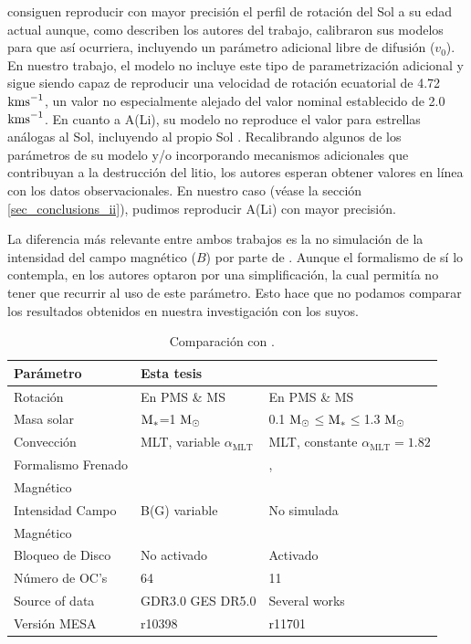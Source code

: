 \cite{Gossage2021} consiguen reproducir con mayor precisión el perfil de rotación del Sol a su edad actual \cite[ver][panel (a) de las figuras 2, 4 \& 6]{Gossage2021} aunque, como describen los autores del trabajo, calibraron sus modelos para que así ocurriera, incluyendo un parámetro adicional libre de difusión ($v_0$). En nuestro trabajo, el modelo no incluye este tipo de parametrización adicional y sigue siendo capaz de reproducir una velocidad de rotación ecuatorial de 4.72 $\mathrm{kms}^{-1}$, un valor no especialmente alejado del valor nominal establecido de 2.0 $\mathrm{kms}^{-1}$. En cuanto a A(Li), su modelo no reproduce el valor para estrellas análogas al Sol, incluyendo al propio Sol \cite[ver][panel (d) de las figuras 2 \& 4, y (b) de la figura 6]{Gossage2021}. Recalibrando algunos de los parámetros de su modelo y/o incorporando mecanismos adicionales que contribuyan a la destrucción del litio, los autores esperan obtener valores en línea con los datos observacionales. En nuestro caso (véase la sección \ref{sec_conclusions_ii}), pudimos reproducir A(Li) con mayor precisión.

La diferencia más relevante entre ambos trabajos es la no simulación de la intensidad del campo magnético ($B$) por parte de \cite{Gossage2021}. Aunque el formalismo de \cite{Garraffo2018} sí lo contempla, en \cite{Gossage2021} los autores optaron por una simplificación, la cual permitía no tener que recurrir al uso de este parámetro. Esto hace que no podamos comparar los resultados obtenidos en nuestra investigación con los suyos.\par  


\begin{table}
	\centering
	\begin{threeparttable}
		\begin{tabular}{lll} 
			\hline
			Parámetro & Esta tesis & \cite{Gossage2021}\\
			\hline
			
			Rotación & En PMS \& MS & En PMS \& MS\\
			Masa solar & $\mathrm{M}_*$=1 $\mathrm{M}_\odot$ & 0.1 $\mathrm{M}_\odot$$\le$$\mathrm{M}_*$$\le$1.3 $\mathrm{M}_\odot$ \\
			Convección & MLT, variable $\alpha_{\textrm{MLT}}$ & MLT, constante $\alpha_{\textrm{MLT}}=1.82$\\
			Formalismo Frenado & \cite{Ud-Doula2007} & \cite{Matt2015}, \\ Magnético & \cite{Gallet2013} & \cite{Garraffo2018}\\
			Intensidad Campo & B(G) variable & No simulada\\ Magnético & & \\
			Bloqueo de Disco & No activado & Activado\\
			Número de OC's & 64 & 11 \\
			Source of data & GDR3.0 GES DR5.0 & Several works \\
			Versión MESA & r10398 & r11701\\
			\hline
		\end{tabular}
	\end{threeparttable}
	\caption{Comparación con \cite{Gossage2021}.}\label{tab:gassage_vs_navarro}    
\end{table}

